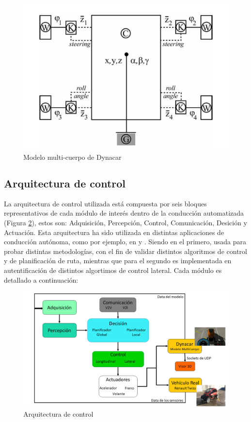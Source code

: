 \begin{figure}[!h]
	\centering
		\includegraphics[scale=0.7]{Imagenes/mult}
		\caption{Modelo multi-cuerpo de Dynacar \cite{cuadrado2013multibody}}
		\label{fig:mult}
\end{figure}	      


\subsection {Arquitectura de control}
La arquitectura de control utilizada está compuesta por seis bloques representativos de cada módulo de interés dentro de la conducción automatizada (Figura \ref{fig:fram}), estos son: Adquisición, Percepción, Control, Comunicación, Desición y Actuación. Esta arquitectura ha sido utilizada en distintas aplicaciones de conducción autónoma, como por ejemplo, en \cite{lattarulo2017complete} y \cite{sriranjanlateral}. Siendo en el primero, usada para probar distintas metodologías, con el fin de validar distintos algoritmos de control y de planificación de ruta, mientras que para el segundo es implementada en autentificación de distintos algortimos de control lateral. Cada módulo es detallado a continuación:

\begin{figure}[!h]
	\centering
		\includegraphics[scale=0.4]{Imagenes/fram}
		\caption{Arquitectura de control}
		\label{fig:fram}
\end{figure}	


